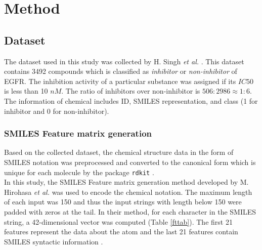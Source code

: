 \documentclass[conference]{IEEEtran}
\begin{document}
\section{Method}
\subsection{Dataset}
The dataset used in this study was collected by H. Singh \textit{et al.} \cite{Singh2015}. This dataset contains 3492 compounds which is classified as \textit{inhibitor} or \textit{non-inhibitor} of EGFR. The inhibition activity of a particular substance was assigned if its $IC50$ is less than 10 $nM$. The ratio of inhibitors over non-inhibitor is $506:2986 \approx 1:6$. The information of chemical includes ID, SMILES representation, and class (1 for inhibitor and 0 for non-inhibitor).




\subsubsection{SMILES Feature matrix generation}
Based on the collected dataset, the chemical structure data in the form of SMILES notation was preprocessed and converted to the canonical form which is unique for each molecule by the package \texttt{rdkit} \cite{rdkit}. \\
In this study, the SMILES Feature matrix generation method developed by M. Hirohasa \textit{et al.} was used to encode the chemical notation. The maximum length of each input was 150 and thus the input strings with length below 150 were padded with zeros at the tail. In their method, for each character in the SMILES string, a 42-dimensional vector was computed (Table \ref{fttab}). The first 21 features represent the data about the atom and the last 21 features contain SMILES syntactic information \cite{Hirohara2018}.
\end{document}
